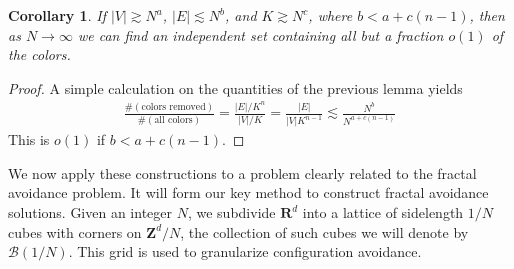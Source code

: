 \documentclass{article}
\theoremstyle{plain}
\newtheorem*{corollary}{Corollary}
\theoremstyle{plain}
\begin{document}
\begin{corollary}
	If $|V| \gtrsim N^a$, $|E| \lesssim N^b$, and $K \gtrsim N^c$, where $b < a + c(n-1)$, then as $N \to \infty$ we can find an independent set containing all but a fraction $o(1)$ of the colors.
\end{corollary}
\begin{proof}
	A simple calculation on the quantities of the previous lemma yields
	\begin{align*}
		\frac{\# ( \text{colors removed} )}{\# ( \text{all colors} )} = \frac{|E|/K^n}{|V|/K} = \frac{|E|}{|V|K^{n-1}} \lesssim \frac{N^b}{N^{a + c(n-1)}}
	\end{align*}
	This is $o(1)$ if $b < a + c(n-1)$.
\end{proof}

We now apply these constructions to a problem clearly related to the fractal avoidance problem. It will form our key method to construct fractal avoidance solutions. Given an integer $N$, we subdivide $\mathbf{R}^d$ into a lattice of sidelength $1/N$ cubes with corners on $\mathbf{Z}^d/N$, the collection of such cubes we will denote by $\mathcal{B}(1/N)$. This grid is used to granularize configuration avoidance.
\end{document}
